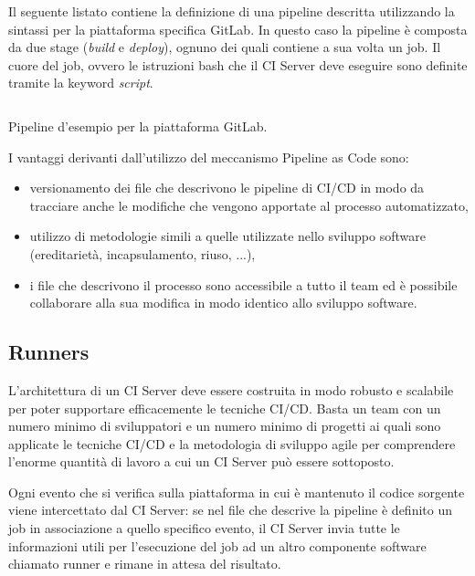 Il seguente listato contiene la definizione di una pipeline descritta utilizzando la sintassi per la piattaforma specifica GitLab. In questo caso la pipeline è composta da due stage (\textit{build} e \textit{deploy}), ognuno dei quali contiene a sua volta un job. Il cuore del job, ovvero le istruzioni bash che il CI Server deve eseguire sono definite tramite la keyword \textit{script}.

\begin{listing}[H]
    \inputminted{yaml}{code/3-pipelineexample}
    \caption{Pipeline d'esempio per la piattaforma GitLab.}
\end{listing}

I vantaggi derivanti dall'utilizzo del meccanismo Pipeline as Code sono:
\begin{itemize}
    \item versionamento dei file che descrivono le pipeline di CI/CD in modo da tracciare anche le modifiche che vengono apportate al processo automatizzato,
    \item utilizzo di metodologie simili a quelle utilizzate nello sviluppo software (ereditarietà, incapsulamento, riuso, ...),
    \item i file che descrivono il processo sono accessibile a tutto il team ed è possibile collaborare alla sua modifica in modo identico allo sviluppo software.
\end{itemize}

\subsection{Runners}
L'architettura di un CI Server deve essere costruita in modo robusto e scalabile per poter supportare efficacemente le tecniche CI/CD. Basta un team con un numero minimo di sviluppatori e un numero minimo di progetti ai quali sono applicate le tecniche CI/CD e la metodologia di sviluppo agile per comprendere l'enorme quantità di lavoro a cui un CI Server può essere sottoposto.

Ogni evento che si verifica sulla piattaforma in cui è mantenuto il codice sorgente viene intercettato dal CI Server: se nel file che descrive la pipeline è definito un job in associazione a quello specifico evento, il CI Server invia tutte le informazioni utili per l'esecuzione del job ad un altro componente software chiamato runner e rimane in attesa del risultato. 

